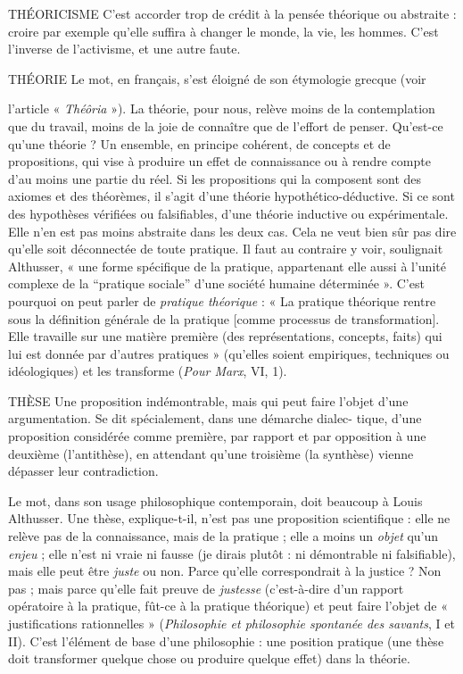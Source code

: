 THÉORICISME C'est accorder trop de crédit à la pensée théorique ou
abstraite : croire par exemple qu’elle suffira à changer le
monde, la vie, les hommes. C’est l’inverse de l’activisme, et une autre faute.

THÉORIE Le mot, en français, s’est éloigné de son étymologie grecque (voir

l'article « {\it Théôria} »). La théorie, pour nous, relève moins de la
contemplation que du travail, moins de la joie de connaître que de l'effort de
penser. Qu’est-ce qu’une théorie ? Un ensemble, en principe cohérent, de concepts
et de propositions, qui vise à produire un effet de connaissance ou à
rendre compte d’au moins une partie du réel. Si les propositions qui la composent
sont des axiomes et des théorèmes, il s’agit d’une théorie hypothético-déductive.
Si ce sont des hypothèses vérifiées ou falsifiables, d’une théorie
inductive ou expérimentale. Elle n’en est pas moins abstraite dans les deux cas.
Cela ne veut bien sûr pas dire qu’elle soit déconnectée de toute pratique. Il faut
au contraire y voir, soulignait Althusser, « une forme spécifique de la pratique,
appartenant elle aussi à l’unité complexe de la “pratique sociale” d’une société
humaine déterminée ». C’est pourquoi on peut parler de {\it pratique théorique} : « La
pratique théorique rentre sous la définition générale de la pratique [comme processus
de transformation]. Elle travaille sur une matière première (des représentations,
concepts, faits) qui lui est donnée par d’autres pratiques » (qu’elles soient
empiriques, techniques ou idéologiques) et les transforme ({\it Pour Marx}, VI, 1).

THÈSE Une proposition indémontrable, mais qui peut faire l’objet d’une
argumentation. Se dit spécialement, dans une démarche dialec-
tique, d’une proposition considérée comme première, par rapport et par opposition
à une deuxième (l'antithèse), en attendant qu’une troisième (la synthèse)
vienne dépasser leur contradiction.

Le mot, dans son usage philosophique contemporain, doit beaucoup à
Louis Althusser. Une thèse, explique-t-il, n’est pas une proposition scientifique :
elle ne relève pas de la connaissance, mais de la pratique ; elle a moins
un {\it objet} qu’un {\it enjeu} ; elle n’est ni vraie ni fausse (je dirais plutôt : ni démontrable
ni falsifiable), mais elle peut être {\it juste} ou non. Parce qu’elle correspondrait
à la justice ? Non pas ; mais parce qu’elle fait preuve de {\it justesse} (c’est-à-dire
d’un rapport opératoire à la pratique, fût-ce à la pratique théorique) et
peut faire l’objet de « justifications rationnelles » ({\it Philosophie et philosophie
spontanée des savants}, I et II). C’est l'élément de base d’une philosophie : une
position pratique (une thèse doit transformer quelque chose ou produire
quelque effet) dans la théorie.

